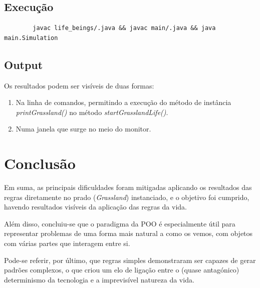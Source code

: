 \documentclass {report}
\begin{document}
\subsection{Execução}	
	\begin{verbatim}
		javac life_beings/.java && javac main/.java && java main.Simulation
	\end{verbatim}

\subsection{Output}
	Os resultados podem ser visíveis de duas formas:
	\begin{enumerate}
		\item Na linha de comandos, permitindo a execução do método de instância 
		   		\textit{printGrassland()} no método \textit{startGrasslandLife()}.
		\item Numa janela que surge no meio do monitor.
	\end{enumerate}


\section{Conclusão}
	Em suma, as principais dificuldades foram mitigadas aplicando os resultados 
	das regras diretamente no prado (\textit{Grassland}) instanciado, 
	e o objetivo foi cumprido, havendo resultados visíveis da aplicação das regras 
	da vida. 

	Além disso, concluiu-se que o paradigma da POO é especialmente útil 
	para representar problemas de uma forma mais natural a como os vemos,
	com objetos com várias partes que interagem entre si.

	Pode-se referir, por último, que regras simples demonstraram ser capazes 
	de gerar padrões complexos, o que criou um elo de ligação entre o 
	(quase antagónico) determinismo da tecnologia e a imprevisível natureza da vida.
\end{document}
